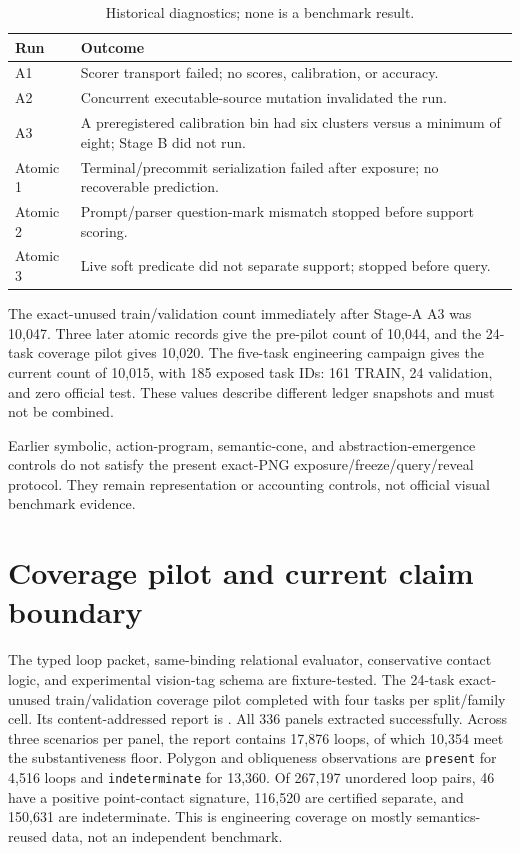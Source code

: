 \documentclass[11pt]{article}
\begin{document}
\begin{table}[h]
\centering
\begin{tabularx}{\textwidth}{lX}
\toprule
Run & Outcome \\
\midrule
A1 & Scorer transport failed; no scores, calibration, or accuracy. \\
A2 & Concurrent executable-source mutation invalidated the run. \\
A3 & A preregistered calibration bin had six clusters versus a minimum of
eight; Stage B did not run. \\
Atomic 1 & Terminal/precommit serialization failed after exposure; no
recoverable prediction. \\
Atomic 2 & Prompt/parser question-mark mismatch stopped before support scoring. \\
Atomic 3 & Live soft predicate did not separate support; stopped before query. \\
\bottomrule
\end{tabularx}
\caption{Historical diagnostics; none is a benchmark result.}
\label{tab:history}
\end{table}

The exact-unused train/validation count immediately after Stage-A A3 was
10,047.  Three later atomic records give the pre-pilot count of 10,044, and the
24-task coverage pilot gives 10,020.  The five-task engineering campaign gives
the current count of 10,015, with 185 exposed task IDs: 161 TRAIN, 24
validation, and zero official test.  These values describe different ledger
snapshots and must not be combined.

Earlier symbolic, action-program, semantic-cone, and abstraction-emergence
controls do not satisfy the present exact-PNG exposure/freeze/query/reveal
protocol.  They remain representation or accounting controls, not official
visual benchmark evidence.

\section{Coverage pilot and current claim boundary}

The typed loop packet, same-binding relational evaluator, conservative contact
logic, and experimental vision-tag schema are fixture-tested.  The 24-task
exact-unused train/validation coverage pilot completed with four tasks per
split/family cell.  Its content-addressed report is
.
All 336 panels extracted successfully.  Across three scenarios per panel, the
report contains 17,876 loops, of which 10,354 meet the substantiveness floor.
Polygon and obliqueness observations are \texttt{present} for 4,516 loops and
\texttt{indeterminate} for 13,360.  Of 267,197 unordered loop pairs, 46 have a
positive point-contact signature, 116,520 are certified separate, and 150,631
are indeterminate.  This is engineering coverage on mostly semantics-reused
data, not an independent benchmark.
\end{document}
